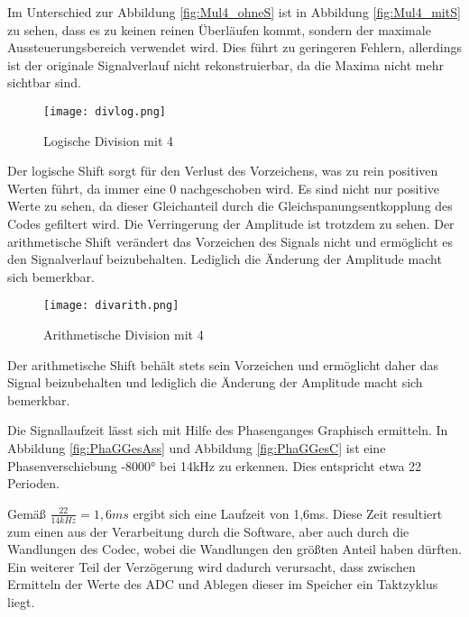 Im Unterschied zur Abbildung \ref{fig:Mul4_ohneS} ist in Abbildung \ref{fig:Mul4_mitS} zu sehen, dass es zu keinen reinen Überläufen kommt, sondern der maximale Aussteuerungsbereich verwendet wird.
Dies führt zu geringeren Fehlern, allerdings ist der originale Signalverlauf nicht rekonstruierbar, da die Maxima nicht mehr sichtbar sind.
\begin{figure}[h!]
  \centering
    \texttt{[image: divlog.png]}
  \caption{Logische Division mit 4}
  \label{fig:divlog}
\end{figure}
Der  logische  Shift  sorgt  f\"ur  den  Verlust  des  Vorzeichens,  was  zu  rein  positiven  Werten
f\"uhrt, da immer eine 0 nachgeschoben wird. 
Es sind nicht nur positive Werte zu sehen, da dieser Gleichanteil durch die Gleichspanungsentkopplung des Codes gefiltert wird.
Die Verringerung der Amplitude ist trotzdem zu sehen. 
Der arithmetische Shift verändert das Vorzeichen des Signals nicht und ermöglicht es den Signalverlauf beizubehalten. 
Lediglich die \"Anderung der Amplitude macht sich bemerkbar.
\begin{figure}[h!]
  \centering
    \texttt{[image: divarith.png]}
  \caption{Arithmetische Division mit 4}
  \label{fig:divarith}
\end{figure}

Der arithmetische Shift behält stets sein Vorzeichen und ermöglicht daher das Signal beizubehalten und lediglich die \"Anderung der Amplitude macht sich 
bemerkbar.\\\par \pagebreak
Die Signallaufzeit lässt sich mit Hilfe des Phasenganges Graphisch ermitteln. 
In Abbildung \ref{fig:PhaGGesAss} und Abbildung \ref{fig:PhaGGesC} ist eine Phasenverschiebung -8000° bei 14kHz zu erkennen. Dies entspricht etwa 22 
Perioden.\\\par
Gemäß \begin{math}\frac{22}{14kHz} = 1,6ms\end{math} ergibt sich eine Laufzeit von 1,6ms. 
Diese Zeit resultiert zum einen aus der Verarbeitung durch die Software, aber auch durch die Wandlungen des Codec, wobei die Wandlungen den größten Anteil haben dürften. 
Ein weiterer Teil der Verzögerung wird dadurch verursacht, dass zwischen Ermitteln der Werte des ADC und Ablegen dieser im Speicher ein Taktzyklus liegt.

